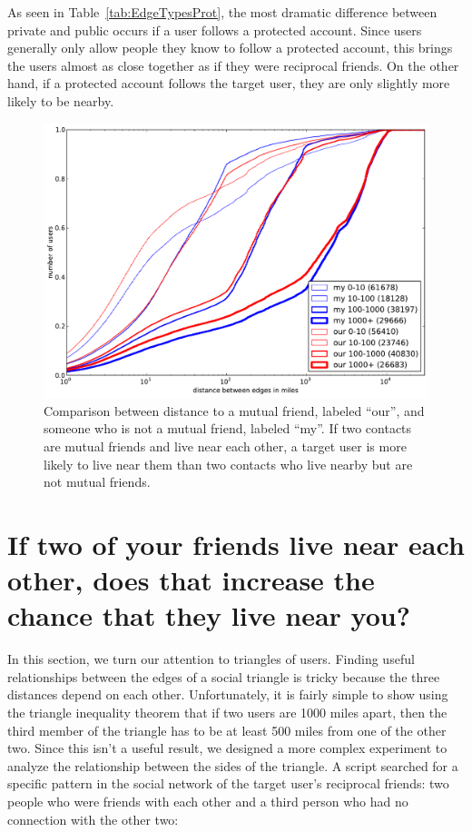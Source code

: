 As seen in Table~\ref{tab:EdgeTypesProt}, the most dramatic difference between
private and public occurs if a user follows a protected account.
%
Since users generally only allow people they know to follow a protected
account, this brings the users almost as close together as if they were
reciprocal friends.
%
On the other hand, if a protected account follows the target user, they
are only slightly more likely to be nearby.

\begin{figure}[tbh]
\centering
\includegraphics[width=\linewidth]{figures/near_triads.pdf}
\caption{
Comparison between distance to a mutual friend, labeled ``our'', and someone
who is not a mutual friend, labeled ``my''.
If two contacts are mutual friends and live near each other, a target user is
more likely to live near them than two contacts who live nearby but are not
mutual friends.
}
\label{fig:NearTriads}
\end{figure}

\section{If two of your friends live near each other, does that increase the
chance that they live near you?}

In this section, we turn our attention to triangles of users.
Finding useful relationships between the edges of a social triangle is tricky
because the three distances depend on each other.
Unfortunately, it is fairly simple to show using the triangle inequality theorem
that if two users are 1000 miles apart, then the third member of the triangle
has to be at least 500 miles from one of the other two.
Since this isn't a useful result, we designed a more complex experiment to
analyze the relationship between the sides of the triangle.
A script searched for a specific pattern in the social network of
the target user's reciprocal friends: two people who were friends with each
other and a third person who had no connection with the other two:


